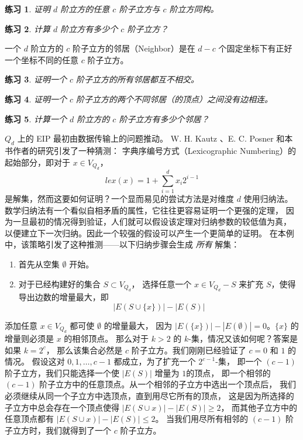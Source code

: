 \documentclass[12pt, a4paper]{article}
\newtheorem{exercise}{练习}
\begin{document}
\begin{exercise}
\label{Exercise 3}
证明 $d$ 阶立方的任意 $c$ 阶子立方与 $c$ 阶立方同构。
\end{exercise}

\begin{exercise}
\label{Exercise 4}
计算 $d$ 阶立方有多少个 $c$ 阶子立方？
\end{exercise}

一个 $d$ 阶立方的 $c$ 阶子立方的邻居（Neighbor）是在 $d − c$
个固定坐标下有正好一个坐标不同的任意 $c$ 阶子立方。

\begin{exercise}
\label{Exercise 5}
证明一个 $c$ 阶子立方的所有邻居都互不相交。
\end{exercise}

\begin{exercise}
\label{Exercise 6}
证明一个 $c$ 阶子立方的两个不同邻居（的顶点）之间没有边相连。
\end{exercise}

\begin{exercise}
\label{Exercise 7}
计算一个 $d$ 阶立方的 $c$ 阶子立方有多少个邻居？
\end{exercise}

$Q_d$ 上的 EIP 最初由数据传输上的问题推动。
W. H. Kautz \cite{Kautz.1954}、E. C. Posner 和本书作者的研究引发了一种猜测：
字典序编号方式（Lexicographic Numbering）的起始部分，即对于 $x \in V_{Q_d}$，
\begin{equation*}
lex(x) = 1 + \sum_{i = 1}^d x_i 2^{i - 1}
\end{equation*}
是解集，然而这要如何证明？一个显而易见的尝试方法是对维度 $d$ 使用归纳法。
数学归纳法有一个看似自相矛盾的属性，它往往更容易证明一个更强的定理，
因为一旦最初的情况得到验证，人们就可以假设该定理对归纳参数的较低值为真，
以便建立下一次归纳。因此一个较强的假设可以产生一个更简单的证明。
在本例中，该策略引发了这种推测——以下归纳步骤会生成 \emph{所有} 解集：

\begin{enumerate}[(1)]
	\item 首先从空集 $\emptyset$ 开始。
	\item 对于已经构建好的集合 $S \subset V_{Q_d}$，
		选择任意一个 $x \in V_{Q_d} − S$ 来扩充 $S$，使得导出边数的增量最大，即
		\begin{equation*}
		|E(S \cup \{x\})| − |E(S)|
		\end{equation*}
\end{enumerate}

添加任意 $x \in V_{Q_d}$ 都可使 $\emptyset$ 的增量最大，
因为 $|E(\{x\})| − |E(\emptyset)| = 0$。$\{x\}$ 的增量则必须是 $x$ 的相邻顶点。
那么对于 $k > 2$ 的 $k$-集，情况又该如何呢？答案是如果 $k = 2^c$，
那么该集合必然是 $c$ 阶子立方。我们刚刚已经验证了 $c = 0$ 和 $1$ 的情况。
假设这对 $0, 1, \dots, c − 1$ 都成立，为了扩充一个 $2^{c − 1}$-集，
即一个 $(c − 1)$ 阶子立方，我们只能选择一个使 $|E(S)|$ 增量为 $1 $的顶点，
即一个相邻的 $(c − 1)$ 阶子立方中的任意顶点。从一个相邻的子立方中选出一个顶点后，
我们必须继续从同一个子立方中选顶点，直到用尽它所有的顶点，
这是因为所选择的子立方中总会存在一个顶点使得 $|E(S \cup {x})| − |E(S)| \ge 2$，
而其他子立方中的任意顶点都有 $|E(S \cup {x})| − |E(S)| \le 2$。
当我们用尽所有相邻的 $(c − 1)$ 阶子立方时，我们就得到了一个 $c$ 阶子立方。
\end{document}

